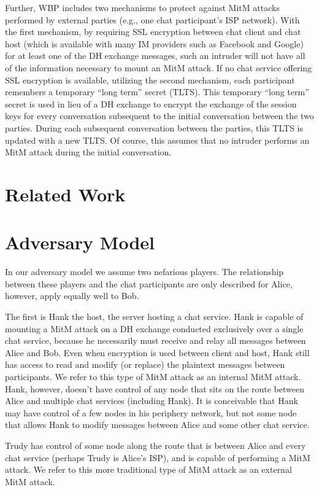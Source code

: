 \documentclass[twoside]{article}
\begin{document}
\begin{multicols}{2}
Further, WBP includes two mechanisms to protect against MitM attacks performed by external parties (e.g., one chat participant's ISP network).  With the first mechanism, by requiring SSL encryption between chat client and chat host (which is available with many IM providers such as Facebook and Google) for at least one of the DH exchange messages, such an intruder will not have all of the information necessary to mount an MitM attack.  If no chat service offering SSL encryption is available, utilizing the second mechanism, each participant remembers a temporary ``long term'' secret (TLTS).  This temporary ``long term'' secret is used in lieu of a DH exchange to encrypt the exchange of the session keys for every conversation subsequent to the initial conversation between the two parties.  During each subsequent conversation between the parties, this TLTS is updated with a new TLTS.  Of course, this assumes that no intruder performs an MitM attack during the initial conversation.

\section{Related Work}

\section{Adversary Model}
In our adversary model we assume two nefarious players.  The relationship between these players and the chat participants are only described for Alice, however, apply equally well to Bob.

The first is Hank the host, the server hosting a chat service.  Hank is capable of mounting a MitM attack on a DH exchange conducted exclusively over a single chat service, because he necessarily must receive and relay all messages between Alice and Bob.  Even when encryption is used between client and host, Hank still has access to read and modify (or replace) the plaintext messages between participants.  We refer to this type of MitM attack as an internal MitM attack.  Hank, however, doesn't have control of any node that sits on the route between Alice and multiple chat services (including Hank).  It is conceivable that Hank may have control of a few nodes in his periphery network, but not some node that allows Hank to modify messages between Alice and some other chat service.

Trudy has control of some node along the route that is between Alice and every chat service (perhaps Trudy is Alice's ISP), and is capable of performing a MitM attack.  We refer to this more traditional type of MitM attack as an external MitM attack.


\end{multicols}
\end{document}
